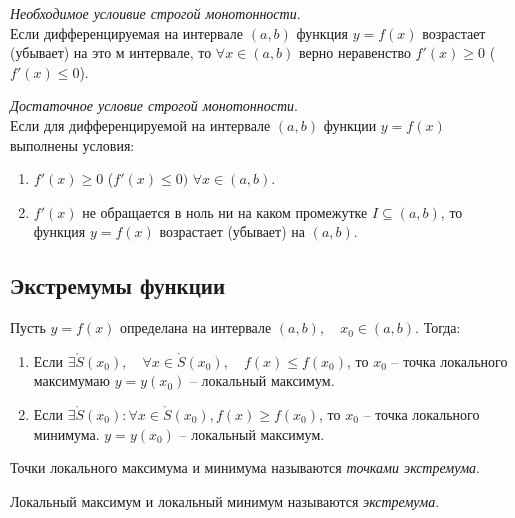 \begin{theorem}
  \textit{Необходимое услоивие строгой монотонности}. \\
  Если дифференцируемая на интервале $(a, b)$ функция $y=f(x)$ возрастает (убывает) на это м интервале, то $\forall x \in (a, b)$ верно неравенство $f'(x) \ge 0$ ($f'(x) \le 0$).
\end{theorem}

\begin{theorem}
  \textit{Достаточное условие строгой монотонности}. \\
  Если для дифференцируемой на интервале $(a, b)$ функции  $y=f(x)$ выполнены условия:
  \begin{enumerate}
    \item $f'(x) \ge 0$ ($f'(x) \le 0)$ $\forall x \in (a, b)$.
    \item $f'(x)$ не обращается в ноль ни на каком промежутке  $I \subseteq (a, b) $, то функция $y = f(x)$ возрастает (убывает) на $(a, b)$.
  \end{enumerate}
\end{theorem}

\subsection{Экстремумы функции}

\begin{definition}
  Пусть $y=f(x)$ определана на интервале $(a, b), \quad x_0 \in (a, b)$. Тогда: 
  \begin{enumerate}
    \item Если $\exists \mathring{S}(x_0), \quad \forall x \in  \mathring{S}(x_0), \quad f(x) \le  f(x_0)$, то $x_0$ -- точка локального максимумаю $y = y(x_0)$ -- локальный максимум.
    \item Если $\exists  \mathring{S}(x_0) : \forall x \in \mathring{S}(x_0), f(x) \ge  f(x_0)$, то $x_0$ -- точка локального минимума. $y=y(x_0)$ -- локальный максимум.
  \end{enumerate}
\end{definition}

\begin{definition}
  Точки локального максимума и минимума называются \textit{точками экстремума}.
\end{definition}

\begin{definition}
  Локальный максимум и локальный минимум называются \textit{экстремума}.
\end{definition}

